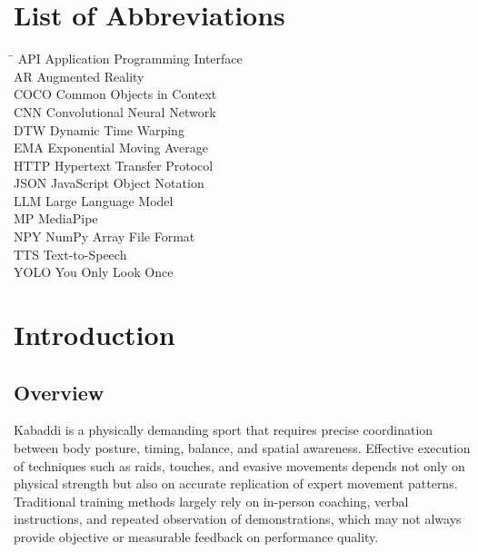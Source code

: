 \documentclass[12pt, a4paper]{report}
\begin{document}
\chapter*{List of Abbreviations}

\begin{tabbing}
\hspace{4cm} \= \kill
API \> Application Programming Interface \\[6pt]
AR \> Augmented Reality \\[6pt]
COCO \> Common Objects in Context \\[6pt]
CNN \> Convolutional Neural Network \\[6pt]
DTW \> Dynamic Time Warping \\[6pt]
EMA \> Exponential Moving Average \\[6pt]
HTTP \> Hypertext Transfer Protocol \\[6pt]
JSON \> JavaScript Object Notation \\[6pt]
LLM \> Large Language Model \\[6pt]
MP \> MediaPipe \\[6pt]
NPY \> NumPy Array File Format \\[6pt]
TTS \> Text-to-Speech \\[6pt]
YOLO \> You Only Look Once \\
\end{tabbing}

\newpage
{}
\chapter{Introduction}

\section{Overview}
Kabaddi is a physically demanding sport that requires precise coordination between body posture, timing, balance, and spatial awareness. Effective execution of techniques such as raids, touches, and evasive movements depends not only on physical strength but also on accurate replication of expert movement patterns. Traditional training methods largely rely on in-person coaching, verbal instructions, and repeated observation of demonstrations, which may not always provide objective or measurable feedback on performance quality.
\end{document}
